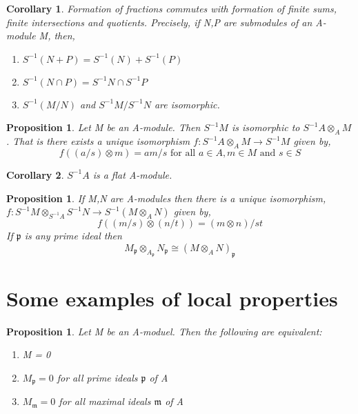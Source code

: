 \documentclass[]{report}
\newtheorem{prop}[theorem]{Proposition}
\newtheorem{corollary}{Corollary}[theorem]
\begin{document}
\begin{corollary}
    Formation of fractions commutes with formation of finite sums, finite intersections and quotients. Precisely, if N,P are submodules of an A-module M, then,
    \begin{enumerate}
        \item $S^{-1}(N+P) = S^{-1}(N) + S^{-1}(P)$
        \item $S^{-1}(N\cap P) = S^{-1}N \cap S^{-1}P$
        \item $S^{-1}(M/N)$ and $S^{-1}M / S^{-1}N$ are isomorphic.
    \end{enumerate}
\end{corollary}

\begin{prop}
    Let M be an A-module. Then $S^{-1}M$ is isomorphic to $S^{-1}A \otimes_A M$. That is there exists a unique isomorphism $f:S^{-1}A \otimes_A M \rightarrow S^{-1}M$ given by,
$$f((a/s)\otimes m) = am/s \text{ for all } a\in A, m\in M \text{ and } s\in S$$
\end{prop}

\begin{corollary}
    $S^{-1}A$ is a flat A-module.
\end{corollary}

\begin{prop} 
    If M,N are A-modules then there is a unique isomorphism, $f: S^{-1}M\otimes_{S^{-1}A} S^{-1}N \rightarrow S^{-1}(M\otimes_A N)$ given by,
$$f((m/s)\otimes (n/t)) = (m\otimes n)/st$$
If $\mathfrak{p}$ is any prime ideal then
$$M_\mathfrak{p}\otimes_{A_\mathfrak{p}} N_\mathfrak{p} \cong (M\otimes_A N)_\mathfrak{p}$$
\end{prop}

\section{Some examples of local properties}

\begin{prop}
    Let M be an A-moduel. Then the following are equivalent:
    \begin{enumerate}
        \item M = 0
        \item $M_\mathfrak{p} = 0$ for all prime ideals $\mathfrak{p}$ of A
        \item $M_\mathfrak{m} = 0$ for all maximal ideals $\mathfrak{m}$ of A
    \end{enumerate}
\end{prop}
\end{document}
